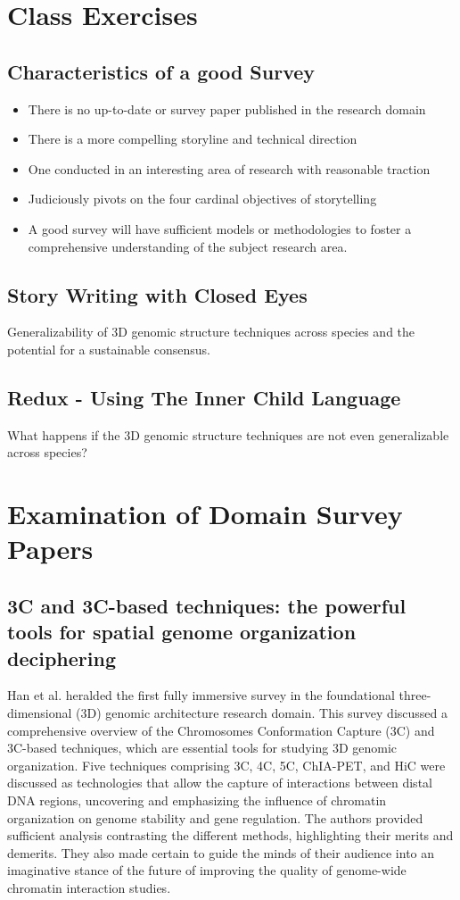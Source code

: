 \section{Class Exercises}
\subsection{Characteristics of a good Survey}
\begin{itemize}
    \item There is no up-to-date or survey paper published in the research domain
    \item There is a more compelling storyline and technical  direction
    \item One conducted in an interesting area of research with reasonable traction
    \item Judiciously pivots on the four cardinal objectives of storytelling
    \item A good survey will have sufficient models or methodologies to foster a comprehensive understanding of the subject research area.
\end{itemize}

\subsection{Story Writing with Closed Eyes}
Generalizability of 3D genomic structure techniques across species and the potential for a sustainable consensus.


\subsection{Redux - Using The Inner Child Language}
What happens if the 3D genomic structure techniques are not even generalizable across species?

\section{Examination of Domain Survey Papers}
\subsection{3C and 3C-based techniques: the powerful tools for spatial genome organization deciphering}
Han et al. \cite{han_3c_2018} heralded the first fully immersive survey in the foundational three-dimensional (3D) genomic architecture research domain. This survey discussed a comprehensive overview of the Chromosomes Conformation Capture (3C) and 3C-based techniques, which are essential tools for studying 3D genomic organization. Five techniques comprising 3C, 4C, 5C, ChIA-PET, and HiC were discussed as technologies that allow the capture of interactions between distal DNA regions, uncovering and emphasizing the influence of chromatin organization on genome stability and gene regulation. The authors provided sufficient analysis contrasting the different methods, highlighting their merits and demerits. They also made certain to guide the minds of their audience into an imaginative stance of the future of improving the quality of genome-wide chromatin interaction studies.
